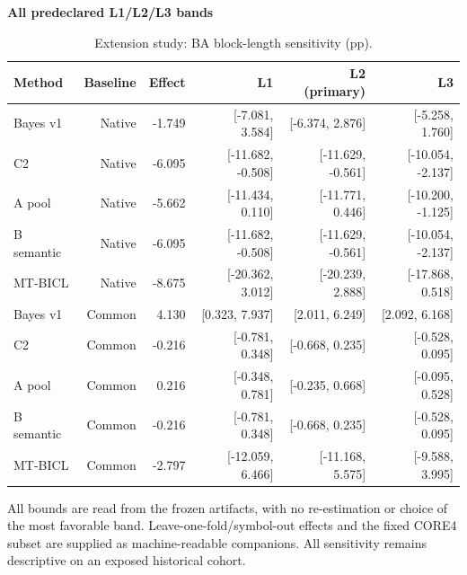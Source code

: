 \begin{table}[p]
\centering\small
\setlength{\tabcolsep}{3pt}
\renewcommand{\arraystretch}{1.12}
\caption{Extension study: BA block-length sensitivity (pp).}
\label{tab:u09-sensitivity-ba}
\textbf{All predeclared L1/L2/L3 bands}\par\smallskip
\begin{tabular}{lrrrrr}
\hline
Method & Baseline & Effect & L1 & L2 (primary) & L3 \\
\hline
Bayes v1 & Native & -1.749 & [-7.081, 3.584] & [-6.374, 2.876] & [-5.258, 1.760] \\
C2 & Native & -6.095 & [-11.682, -0.508] & [-11.629, -0.561] & [-10.054, -2.137] \\
A pool & Native & -5.662 & [-11.434, 0.110] & [-11.771, 0.446] & [-10.200, -1.125] \\
B semantic & Native & -6.095 & [-11.682, -0.508] & [-11.629, -0.561] & [-10.054, -2.137] \\
MT-BICL & Native & -8.675 & [-20.362, 3.012] & [-20.239, 2.888] & [-17.868, 0.518] \\
Bayes v1 & Common & 4.130 & [0.323, 7.937] & [2.011, 6.249] & [2.092, 6.168] \\
C2 & Common & -0.216 & [-0.781, 0.348] & [-0.668, 0.235] & [-0.528, 0.095] \\
A pool & Common & 0.216 & [-0.348, 0.781] & [-0.235, 0.668] & [-0.095, 0.528] \\
B semantic & Common & -0.216 & [-0.781, 0.348] & [-0.668, 0.235] & [-0.528, 0.095] \\
MT-BICL & Common & -2.797 & [-12.059, 6.466] & [-11.168, 5.575] & [-9.588, 3.995] \\
\hline
\end{tabular}\par\medskip
\begin{minipage}{\textwidth}\footnotesize All bounds are read from the frozen artifacts, with no re-estimation or choice of the most favorable band. Leave-one-fold/symbol-out effects and the fixed CORE4 subset are supplied as machine-readable companions. All sensitivity remains descriptive on an exposed historical cohort.\end{minipage}
\end{table}
